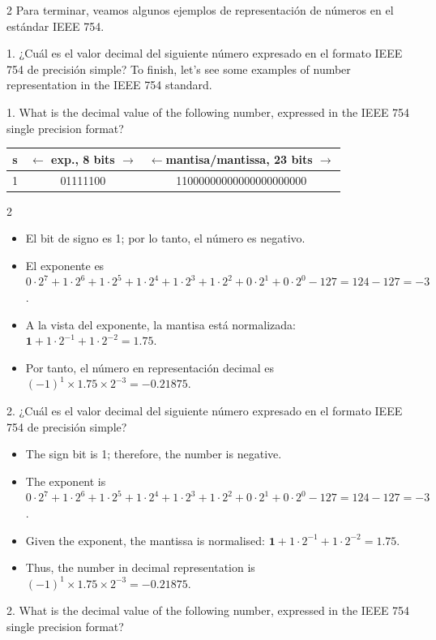\begin{paracol}{2}
Para terminar, veamos algunos ejemplos de representación de números en el estándar IEEE 754.

1. ¿Cuál es el valor decimal del siguiente número expresado en el formato IEEE 754 de precisión simple?
\switchcolumn
To finish, let's see some examples of number representation in the IEEE 754 standard.

1. What is the decimal value of the following number, expressed in the IEEE 754 single precision format?
\end{paracol}
\begin{center}
\begin{tabular}{|c||c||c|}
\hline
s&$\leftarrow$ exp., 8 bits $\rightarrow$&$\leftarrow$mantisa/mantissa, 23 bits $\rightarrow$\\
\hline
1&01111100&11000000000000000000000\\
\hline
\end{tabular}
\end{center}
\begin{paracol}{2}
\begin{itemize}[leftmargin=\dimexpr 26pt-.25in]
\item El bit de signo es 1; por lo tanto, el número es negativo.
\item El exponente es $0\cdot2^7+1\cdot2^6+1\cdot2^5+1\cdot2^4+1\cdot2^3+1\cdot2^2+0\cdot2^1+0\cdot2^0-127=124-127=-3$.
\item A la vista del exponente, la mantisa está normalizada: $\mathbf{1}+1\cdot2^{-1}+1\cdot2^{-2}=1.75$.
\item Por tanto, el número en representación decimal es $ (-1)^1\times1.75\times2^{-3}=-0.21875$.
\end{itemize}

2. ¿Cuál es el valor decimal del siguiente número expresado en el formato IEEE 754 de precisión simple?
\switchcolumn
\begin{itemize}[leftmargin=\dimexpr 26pt-.25in]
	\item The sign bit is 1; therefore, the number is negative.
	\item The exponent is $0\cdot2^7+1\cdot2^6+1\cdot2^5+1\cdot2^4+1\cdot2^3+1\cdot2^2+0\cdot2^1+0\cdot2^0-127=124-127=-3$.
	\item Given the exponent, the mantissa is normalised: $\mathbf{1}+1\cdot2^{-1}+1\cdot2^{-2}=1.75$.
	\item Thus, the number in decimal representation is $ (-1)^1\times1.75\times2^{-3}=-0.21875$.
\end{itemize}

2. What is the decimal value of the following number, expressed in the IEEE 754 single precision format?
\end{paracol}

